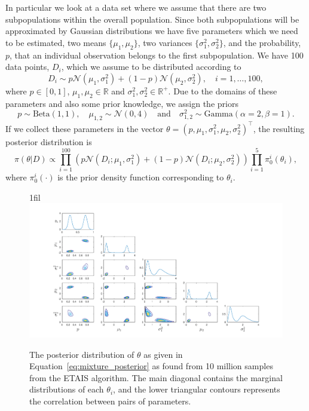 \documentclass[final]{siamltex}
\makeatletter
\newcommand*{\centerfloat}{%
  \parindent \z@
  \leftskip \z@ \@plus 1fil \@minus \textwidth
  \rightskip\leftskip
  \parfillskip \z@skip}
\makeatother
\begin{document}
In particular we look at a data set where we assume that there are two
subpopulations within the overall population. Since both
subpopulations will be approximated by Gaussian distributions we have
five parameters which we need to be estimated, two means $\{\mu_{1}, \mu_{2}\}$,
two variances $\{\sigma^2_{1}, \sigma^2_{2}\}$, and the probability, $p$, that an
individual observation belongs to the first subpopulation. We have 100
data points, $D_i$, which we assume to be distributed according to
\[
	D_i \sim p\mathcal{N}(\mu_1, \sigma^2_1) + (1-p)\mathcal{N}
	(\mu_2, \sigma^2_2), \quad i = 1,\dots,100,
\]
where $p \in [0, 1]$, $\mu_{1},\mu_2 \in \mathbb{R}$ and $\sigma^2_{1},\sigma^2_2
\in \mathbb{R}^+$. Due to the domains of these parameters and also
some prior knowledge, we assign the priors
\[
	p \sim \text{Beta}(1,1), \quad \mu_{1,2} \sim \mathcal{N}(0, 4)
	 \quad \text{and} \quad \sigma^2_{1,2} \sim \text{Gamma}
	(\alpha=2, \beta=1).
\]
If we collect these parameters in the vector $\theta = (p, \mu_1,
\sigma^2_1, \mu_2, \sigma^2_2)^\top$, the resulting posterior
distribution is
\begin{equation}\label{eq:mixture_posterior}
	\pi(\theta|D) \propto \prod\limits_{i=1}^{100} (p\mathcal{N}
	(D_i;\mu_1, \sigma^2_1) + (1-p)\mathcal{N}(D_i;\mu_2, \sigma^2_2))
	\prod\limits_{i=1}^5 \pi_0^i(\theta_i),
\end{equation}
where $\pi_0^i(\cdot)$ is the prior density function corresponding to $\theta_i$.

\begin{figure}[htb]
\centerfloat
\includegraphics[width=1.2\textwidth]{"figures/PAIS_best_posterior"}
\caption{The posterior distribution of $\theta$ as given in
Equation~\eqref{eq:mixture_posterior} as found from 10 million samples
from the ETAIS algorithm. The main diagonal contains the marginal
distributions of each $\theta_i$, and the lower triangular contours
represents the correlation between pairs of parameters.}
\label{fig:mixture_posterior}
\end{figure}
\end{document}
